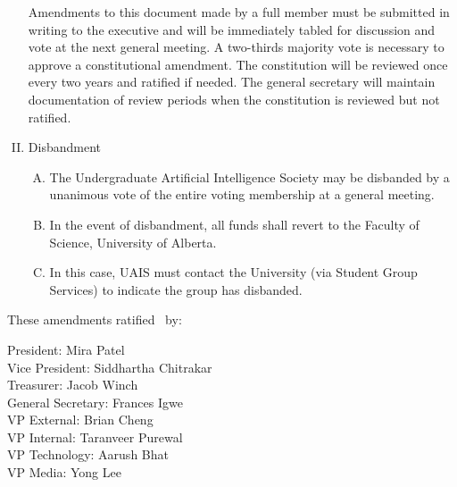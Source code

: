 \documentclass[11pt]{article}
\begin{document}
\begin{enumerate}[I.]
    Amendments to this document made by a full member must be submitted in
    writing to the executive and will be immediately tabled for discussion and vote at the next general meeting. A two-thirds majority vote is necessary to approve a constitutional amendment. The constitution will be reviewed once every two years and ratified if needed. The general secretary will maintain documentation of review periods when the constitution is reviewed but not ratified.
  \item Disbandment
    \begin{enumerate}[A)]
      \item The Undergraduate Artificial Intelligence Society may be disbanded by a unanimous vote of the entire voting membership at a general meeting.
      \item  In the event of disbandment, all funds shall revert to the Faculty of Science, University of Alberta.
      \item In this case, UAIS must contact the University (via Student Group Services) to indicate the group has disbanded.
    \end{enumerate}
\end{enumerate}

These amendments ratified \thedate\ by:

President: Mira Patel \\
Vice President: Siddhartha Chitrakar \\
Treasurer: Jacob Winch \\
General Secretary: Frances Igwe \\
VP External: Brian Cheng \\
VP Internal: Taranveer Purewal \\
VP Technology: Aarush Bhat \\
VP Media: Yong Lee \\
\end{document}
